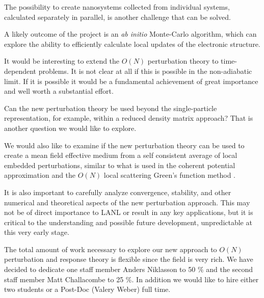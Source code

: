 The possibility to create nanosystems collected from individual systems, calculated
separately in parallel, is another challenge that can be solved.

A likely outcome of the project is an {\em ab initio} 
Monte-Carlo algorithm, which can explore the ability to efficiently 
calculate local updates of the electronic structure.

It would be interesting to extend the $O(N)$ perturbation 
theory to time-dependent problems. It is not clear at all if this is 
possible in the non-adiabatic limit. If it is possible it would be a 
fundamental achievement of great importance and well worth
a substantial effort.

Can the new perturbation theory be used beyond the single-particle
representation, for example, within a reduced density matrix approach? 
That is another question we would like to explore.

We would also like to examine if the new perturbation theory can be used to 
create a mean field effective medium from a self consistent average of 
local embedded perturbations, similar to what is used in the coherent 
potential approximation and the $O(N)$ local scattering Green's function 
method \cite{Igor}.

It is also important to carefully analyze convergence,
stability, and other numerical and theoretical aspects 
of the new perturbation approach. This may not be of direct 
importance to LANL or result in any key applications, but
it is critical to the understanding and possible future 
development, unpredictable at this very early stage.

The total amount of work necessary to explore our new approach
to $O(N)$ perturbation and response theory is flexible since 
the field is very rich. We have decided to dedicate one staff member
Anders Niklasson to 50 $\%$  and the second staff member
Matt Challacombe to 25 $\%$. In addition we would like
to hire either two students or a Post-Doc (Valery Weber)
full time.

